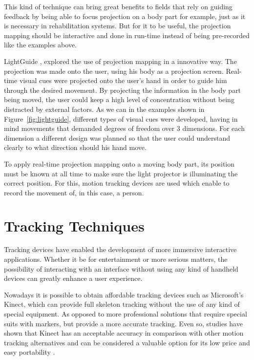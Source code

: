 This kind of technique can bring great benefits to fields that rely on guiding feedback by being able 
to focus projection on a body part for example, just as it is necessary in rehabilitation systems.
But for it to be useful, the projection mapping should be interactive and done in run-time instead of 
being pre-recorded like the examples above.

LightGuide \cite{Sodhi2012}, explored the use of projection mapping in a innovative way. 
The projection was made onto the user, using his body as a projection screen. 
Real-time visual cues were projected onto the user's hand in order to guide him through the desired movement. 
By projecting the information in the body part being moved, the user could keep a high level of concentration 
without being distracted by external factors.
As we can in the examples shown in Figure~\ref{fig:lightguide}, different types of visual cues were developed, having in mind movements that demanded degrees of freedom over 3 dimensions. 
For each dimension a different design was planned so that the user could understand clearly to what direction 
should his hand move.

To apply real-time projection mapping onto a moving body part, its 
position must be known at all time to make sure the light projector is 
illuminating the correct position. 
For this, motion tracking devices are used which enable to record the movement of, in this case, a person. 

\section{Tracking Techniques} 

Tracking devices have enabled the development of more immersive interactive applications.
Whether it be for entertainment or more serious matters, the possibility of interacting with 
an interface without using any kind of handheld devices can greatly enhance a user experience.

Nowadays it is possible to obtain affordable tracking devices such as Microsoft's Kinect, which 
can provide full skeleton tracking without the use of any kind of special equipment.
As opposed to more professional solutions that require special suits with markers, but provide a more accurate tracking. 
Even so, studies have shown that Kinect has an acceptable accuracy in comparison with other motion tracking alternatives 
and can be considered a valuable option for its low price and easy portability \cite{Scano2014,Chang2012a}.

